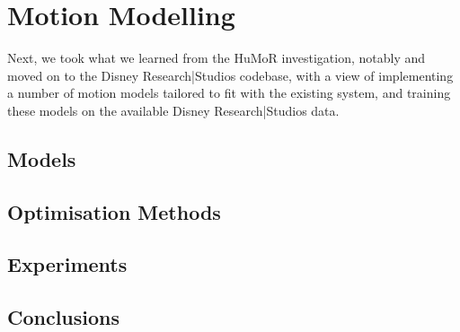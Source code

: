 \section{Motion Modelling}

Next, we took what we learned from the HuMoR investigation, notably  and moved on to the Disney Research|Studios codebase, with a view of implementing a number of motion models tailored to fit with the existing system, and training these models on the available Disney Research|Studios data.

\subsection{Models}


\subsection{Optimisation Methods}


\subsection{Experiments}


\subsection{Conclusions}